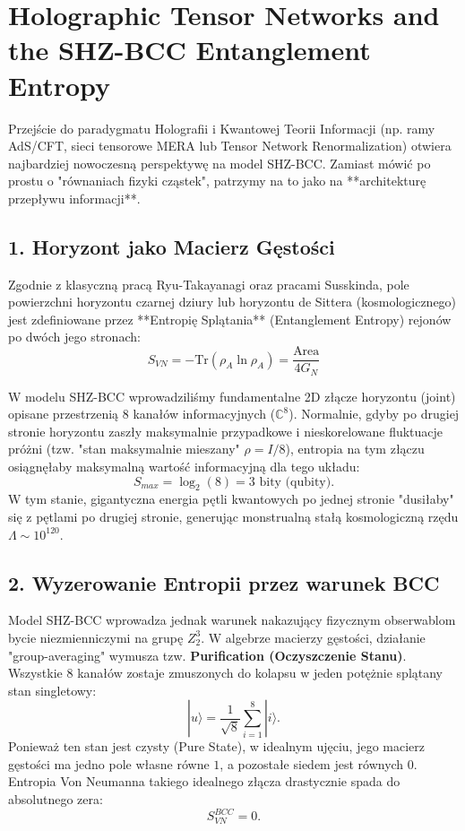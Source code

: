 \documentclass[11pt,a4paper]{article}
\begin{document}
\section*{Holographic Tensor Networks and the SHZ-BCC Entanglement Entropy}

Przejście do paradygmatu Holografii i Kwantowej Teorii Informacji (np. ramy AdS/CFT, sieci tensorowe MERA lub Tensor Network Renormalization) otwiera najbardziej nowoczesną perspektywę na model SHZ-BCC. Zamiast mówić po prostu o "równaniach fizyki cząstek", patrzymy na to jako na **architekturę przepływu informacji**.

\subsection*{1. Horyzont jako Macierz Gęstości}
Zgodnie z klasyczną pracą Ryu-Takayanagi oraz pracami Susskinda, pole powierzchni horyzontu czarnej dziury lub horyzontu de Sittera (kosmologicznego) jest zdefiniowane przez **Entropię Splątania** (Entanglement Entropy) rejonów po dwóch jego stronach:
\begin{equation}
    S_{VN} = - \text{Tr} \left( \rho_{A} \ln \rho_{A} \right) = \frac{\text{Area}}{4 G_N}
\end{equation}

W modelu SHZ-BCC wprowadziliśmy fundamentalne 2D złącze horyzontu (joint) opisane przestrzenią $8$ kanałów informacyjnych ($\mathbb{C}^8$).
Normalnie, gdyby po drugiej stronie horyzontu zaszły maksymalnie przypadkowe i nieskorelowane fluktuacje próżni (tzw. "stan maksymalnie mieszany" $\rho = I / 8$), entropia na tym złączu osiągnęłaby maksymalną wartość informacyjną dla tego układu: 
\begin{equation}
    S_{max} = \log_2(8) = 3 \text{ bity (qubity)}.
\end{equation}
W tym stanie, gigantyczna energia pętli kwantowych po jednej stronie "dusiłaby" się z pętlami po drugiej stronie, generując monstrualną stałą kosmologiczną rzędu $\Lambda \sim 10^{120}$.

\subsection*{2. Wyzerowanie Entropii przez warunek BCC}
Model SHZ-BCC wprowadza jednak warunek nakazujący fizycznym obserwablom bycie niezmienniczymi na grupę $Z_2^3$. W algebrze macierzy gęstości, działanie "group-averaging" wymusza tzw. \textbf{Purification (Oczyszczenie Stanu)}. 
Wszystkie 8 kanałów zostaje zmuszonych do kolapsu w jeden potężnie splątany stan singletowy:
\begin{equation}
    |u\rangle = \frac{1}{\sqrt{8}} \sum_{i=1}^8 |i\rangle.
\end{equation}
Ponieważ ten stan jest czysty (Pure State), w idealnym ujęciu, jego macierz gęstości ma jedno pole własne równe $1$, a pozostałe siedem jest równych $0$.
Entropia Von Neumanna takiego idealnego złącza drastycznie spada do absolutnego zera:
\begin{equation}
    S_{VN}^{BCC} = 0.
\end{equation}
\end{document}
